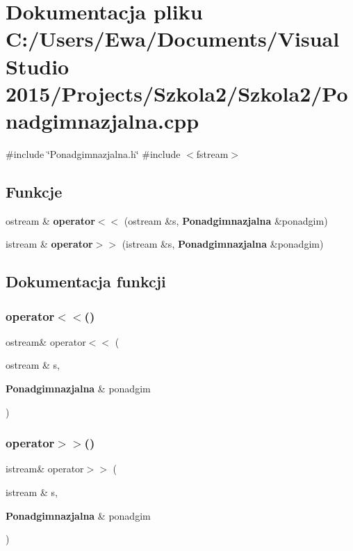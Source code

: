 \section{Dokumentacja pliku C\+:/\+Users/\+Ewa/\+Documents/\+Visual Studio 2015/\+Projects/\+Szkola2/\+Szkola2/\+Ponadgimnazjalna.cpp}
\label{_ponadgimnazjalna_8cpp}
{\ttfamily \#include \char`\"{}Ponadgimnazjalna.\+h\char`\"{}}\newline
{\ttfamily \#include $<$fstream$>$}\newline
\subsection*{Funkcje}
\begin{DoxyCompactItemize}
\item 
ostream \& \textbf{ operator$<$$<$} (ostream \&s, \textbf{ Ponadgimnazjalna} \&ponadgim)
\item 
istream \& \textbf{ operator$>$$>$} (istream \&s, \textbf{ Ponadgimnazjalna} \&ponadgim)
\end{DoxyCompactItemize}


\subsection{Dokumentacja funkcji}
\mbox{\label{_ponadgimnazjalna_8cpp_a943c5cea6c4ed7ef06221e66707c693c}} 
\subsubsection{operator$<$$<$()}
{\footnotesize\ttfamily ostream\& operator$<$$<$ (\begin{DoxyParamCaption}\item[{ostream \&}]{s,  }\item[{\textbf{ Ponadgimnazjalna} \&}]{ponadgim }\end{DoxyParamCaption})}

\mbox{\label{_ponadgimnazjalna_8cpp_a0b7ee50c2103c8db78c22586940f6e3b}} 
\subsubsection{operator$>$$>$()}
{\footnotesize\ttfamily istream\& operator$>$$>$ (\begin{DoxyParamCaption}\item[{istream \&}]{s,  }\item[{\textbf{ Ponadgimnazjalna} \&}]{ponadgim }\end{DoxyParamCaption})}

